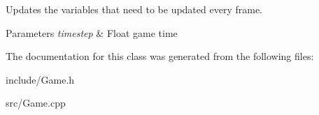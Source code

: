 Updates the variables that need to be updated every frame. 


\begin{DoxyParams}{Parameters}
{\em timestep} & Float game time \\
\hline
\end{DoxyParams}


The documentation for this class was generated from the following files\+:\begin{DoxyCompactItemize}
\item 
include/Game.\+h\item 
src/Game.\+cpp\end{DoxyCompactItemize}
